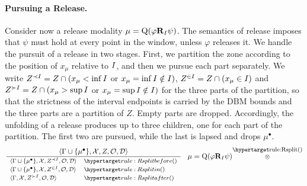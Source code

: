 \paragraph{Pursuing a Release.}
Consider now a release modality $\mu=\mathrm{Q}(\varphi\mathbf{R}_I\psi)$. The semantics of release imposes that $\psi$ must hold at every point in the window, unless $\varphi$ releases it. We handle the pursuit of a release in two stages. First, we partition the zone according to the position of $x_\mu$ relative to $I$, and then we pursue each part separately. We write $Z^{\prec I} = Z\cap(x_\mu<\inf I$ or $ x_\mu=\inf I\notin I)$, $Z^{\in I} = Z\cap(x_\mu\in I)$ and $Z^{\succ I} = Z\cap(x_\mu>\sup I$ or $ x_\mu=\sup I\notin I)$ for the three parts of the partition,
%
%
%
so that the strictness of the interval endpoints is carried by the DBM bounds and the three parts are a partition of $Z$. Empty parts are dropped. Accordingly, the unfolding of a release produces up to three children, one for each part of the partition. The first two are pursued, while the last is lapsed and drops $\mu^\bullet$.
\vspace{-0.2cm}
\[
\footnotesize
\frac{\tup{\Gamma\cup\{\mu^\bullet\}}{\Ctx}{Z}{\obligations}{\Deadline}}
{\begin{array}{lll}
\tup{\Gamma\cup\{\mu^\bullet\}}{\Ctx}{\ZltI}{\obligations}{\Deadline} & \ruleanchor{Rsplitbefore}\\[2pt]
\tup{\Gamma\cup\{\mu^\bullet\}}{\Ctx}{\ZinI}{\obligations}{\Deadline} & \ruleanchor{Rsplitin}\\[2pt]
\tup{\Gamma}{\Ctx}{\ZgtI}{\obligations}{\Deadline} & \ruleanchor{Rsplitafter}
\end{array}}
\quad \mu=\mathrm{Q}(\varphi\mathbf{R}_\kI\psi)
\shortstack{\ruleanchor{Rsplit}\\\ANDn}
\]

